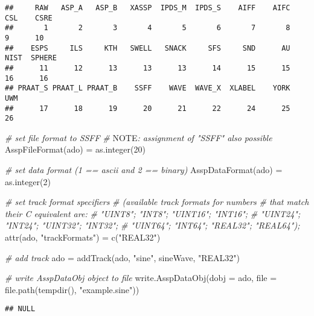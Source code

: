 \documentclass[
]{book}
\newenvironment{Shaded}{\begin{snugshade}}{\end{snugshade}}
\newcommand{\AlertTok}[1]{\textcolor[rgb]{0.94,0.16,0.16}{#1}}
\newcommand{\AttributeTok}[1]{\textcolor[rgb]{0.77,0.63,0.00}{#1}}
\newcommand{\CommentTok}[1]{\textcolor[rgb]{0.56,0.35,0.01}{\textit{#1}}}
\newcommand{\DecValTok}[1]{\textcolor[rgb]{0.00,0.00,0.81}{#1}}
\newcommand{\FunctionTok}[1]{\textcolor[rgb]{0.00,0.00,0.00}{#1}}
\newcommand{\NormalTok}[1]{#1}
\newcommand{\OtherTok}[1]{\textcolor[rgb]{0.56,0.35,0.01}{#1}}
\newcommand{\StringTok}[1]{\textcolor[rgb]{0.31,0.60,0.02}{#1}}
\begin{document}
\begin{verbatim}
##     RAW   ASP_A   ASP_B   XASSP  IPDS_M  IPDS_S    AIFF    AIFC     CSL    CSRE 
##       1       2       3       4       5       6       7       8       9      10 
##    ESPS     ILS     KTH   SWELL   SNACK     SFS     SND      AU    NIST  SPHERE 
##      11      12      13      13      13      14      15      15      16      16 
## PRAAT_S PRAAT_L PRAAT_B    SSFF    WAVE  WAVE_X  XLABEL    YORK     UWM 
##      17      18      19      20      21      22      24      25      26
\end{verbatim}

\begin{Shaded}
\begin{Highlighting}[]
\CommentTok{\# set file format to SSFF}
\CommentTok{\# }\AlertTok{NOTE}\CommentTok{: assignment of "SSFF" also possible}
\FunctionTok{AsspFileFormat}\NormalTok{(ado) }\OtherTok{=} \FunctionTok{as.integer}\NormalTok{(}\DecValTok{20}\NormalTok{)}

\CommentTok{\# set data format (1 == \textquotesingle{}ascii\textquotesingle{} and 2 == \textquotesingle{}binary\textquotesingle{})}
\FunctionTok{AsspDataFormat}\NormalTok{(ado) }\OtherTok{=} \FunctionTok{as.integer}\NormalTok{(}\DecValTok{2}\NormalTok{)}

\CommentTok{\# set track format specifiers}
\CommentTok{\# (available track formats for numbers}
\CommentTok{\# that match their C equivalent are:}
\CommentTok{\# "UINT8"; "INT8"; "UINT16"; "INT16";}
\CommentTok{\# "UINT24"; "INT24"; "UINT32"; "INT32";}
\CommentTok{\# "UINT64"; "INT64"; "REAL32"; "REAL64");}
\FunctionTok{attr}\NormalTok{(ado, }\StringTok{"trackFormats"}\NormalTok{) }\OtherTok{=} \FunctionTok{c}\NormalTok{(}\StringTok{"REAL32"}\NormalTok{)}

\CommentTok{\# add track}
\NormalTok{ado }\OtherTok{=} \FunctionTok{addTrack}\NormalTok{(ado, }\StringTok{"sine"}\NormalTok{, sineWave, }\StringTok{"REAL32"}\NormalTok{)}

\CommentTok{\# write AsspDataObj object to file}
\FunctionTok{write.AsspDataObj}\NormalTok{(}\AttributeTok{dobj =}\NormalTok{ ado,}
                  \AttributeTok{file =} \FunctionTok{file.path}\NormalTok{(}\FunctionTok{tempdir}\NormalTok{(), }\StringTok{"example.sine"}\NormalTok{))}
\end{Highlighting}
\end{Shaded}

\begin{verbatim}
## NULL
\end{verbatim}
\end{document}
